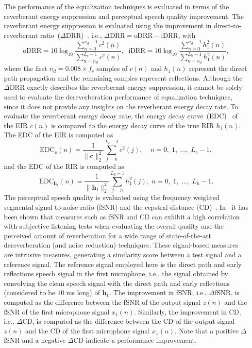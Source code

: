 \documentclass[twocolumn]{bmcart}%
\begin{document}
The performance of the equalization techniques is evaluated in terms of the reverberant energy suppression and perceptual speech quality improvement. 
The reverberant energy suppression is evaluated using the improvement in direct-to-reverberant ratio~($\Delta$DRR)~\cite{Naylor_Derev_book}, i.e., $\Delta {\text{DRR}} = {\text{oDRR}} - {\text{iDRR}}$, with
\begin{equation}
{\text{oDRR}}\!\! = \!\!10 \log_{10} \frac{\sum\limits_{n=0}^{n_d-1} c^2(n)}{\sum\limits_{n=n_d}^{L_c-1} c^2(n)}, \; \; {\text{iDRR}}\!\! = \!\!10 \log_{10} \frac{\sum\limits_{n=0}^{n_d-1} h_1^2(n)}{\sum\limits_{n=n_d}^{L_h-1} h_1^2(n)},
\end{equation}
where the first $n_d = 0.008 \times f_s$ samples of $c(n)$ and $h_1(n)$ represent the direct path propagation and the remaining samples represent reflections.
Although the $\Delta$DRR exactly describes the reverberant energy suppression, it cannot be solely used to evaluate the dereverberation performance of equalization techniques, since it does not provide any insights on the reverberant energy decay rate.
To evaluate the reverberant energy decay rate, the energy decay curve~(EDC)~\cite{Naylor_Derev_book} of the EIR $c(n)$ is compared to the energy decay curve of the true RIR $h_1(n)$.
The EDC of the EIR is computed as
\begin{equation}
\label{eq: edc}
{\text{EDC}}_{\mathbf{c}}(n) = \frac{1}{\| \mathbf{c} \|_2^2} \sum_{j=n}^{L_c-1}c^2(j), \; \; \; \; n = 0, \; 1, \; \ldots, \; L_c-1,
\end{equation}
and the EDC of the RIR is computed as
\begin{equation}
{\text{EDC}}_{\mathbf{h}_1}(n) = \frac{1}{\| \mathbf{h}_1 \|_2^2} \!\!\!\sum_{j=n}^{L_h-1}h_1^2(j), \; n = 0, \; 1, \; \ldots, \; L_h-1.
\end{equation}
The perceptual speech quality is evaluated using the frequency weighted segmental signal-to-noise-ratio (fSNR) and the cepstral distance (CD)~\cite{Hu_ITASLP_2008}.
In~\cite{REVERB2016} it has been shown that measures such as fSNR and CD can exhibit a high correlation with subjective listening tests when evaluating the overall quality and the perceived amount of reverberation for a wide range of state-of-the-art dereverberation (and noise reduction) techniques.
These signal-based measures are intrusive measures, generating a similarity score between a test signal and a reference signal.
The reference signal employed here is the direct path and early reflections speech signal in the first microphone, i.e., the signal obtained by convolving the clean speech signal with the direct path and early reflections (considered to be $10$ ms long) of $\mathbf{h}_1$.
The improvement in fSNR, i.e., $\Delta$fSNR, is computed as the difference between the fSNR of the output signal $z(n)$ and the fSNR of the first microphone signal $x_1(n)$.
Similarly, the improvement in CD, i.e., $\Delta$CD, is computed as the difference between the CD of the output signal $z(n)$ and the CD of the first microphone signal $x_1(n)$.
Note that a positive $\Delta$fSNR and a negative $\Delta$CD indicate a performance improvement.
\end{document}
